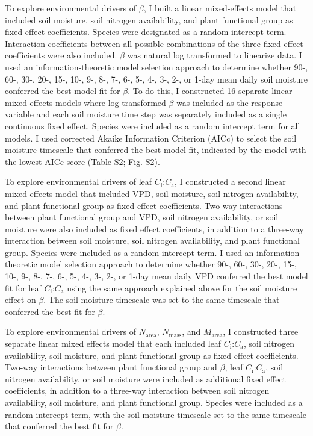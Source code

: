 To explore environmental drivers of $\beta$, I built a linear mixed-effects model that included soil moisture, soil nitrogen availability, and plant functional group as fixed effect coefficients. Species were designated as a random intercept term. Interaction coefficients between all possible combinations of the three fixed effect coefficients were also included. $\beta$ was natural log transformed to linearize data. I used an information-theoretic model selection approach to determine whether 90-, 60-, 30-, 20-, 15-, 10-, 9-, 8-, 7-, 6-, 5-, 4-, 3-, 2-, or 1-day mean daily soil moisture conferred the best model fit for $\beta$. To do this, I constructed 16 separate linear mixed-effects models where log-transformed $\beta$ was included as the response variable and each soil moisture time step was separately included as a single continuous fixed effect. Species were included as a random intercept term for all models. I used corrected Akaike Information Criterion (AICc) to select the soil moisture timescale that conferred the best model fit, indicated by the model with the lowest AICc score (Table S2; Fig. S2).

To explore environmental drivers of leaf $C_\mathrm{i}$:$C_\mathrm{a}$, I constructed a second linear mixed effects model that included VPD, soil moisture, soil nitrogen availability, and plant functional group as fixed effect coefficients. Two-way interactions between plant functional group and VPD, soil nitrogen availability, or soil moisture were also included as fixed effect coefficients, in addition to a three-way interaction between soil moisture, soil nitrogen availability, and plant functional group. Species were included as a random intercept term. I used an information-theoretic model selection approach to determine whether 90-, 60-, 30-, 20-, 15-, 10-, 9-, 8-, 7-, 6-, 5-, 4-, 3-, 2-, or 1-day mean daily VPD conferred the best model fit for leaf $C_\mathrm{i}$:$C_\mathrm{a}$ using the same approach explained above for the soil moisture effect on $\beta$. The soil moisture timescale was set to the same timescale that conferred the best fit for $\beta$.

To explore environmental drivers of $N_\mathrm{area}$, $N_\mathrm{mass}$, and $M_\mathrm{area}$, I constructed three separate linear mixed effects model that each included leaf $C_\mathrm{i}$:$C_\mathrm{a}$, soil nitrogen availability, soil moisture, and plant functional group as fixed effect coefficients. Two-way interactions between plant functional group and $\beta$, leaf $C_\mathrm{i}$:$C_\mathrm{a}$, soil nitrogen availability, or soil moisture were included as additional fixed effect coefficients, in addition to a three-way interaction between soil nitrogen availability, soil moisture, and plant functional group. Species were included as a random intercept term, with the soil moisture timescale set to the same timescale that conferred the best fit for $\beta$.

